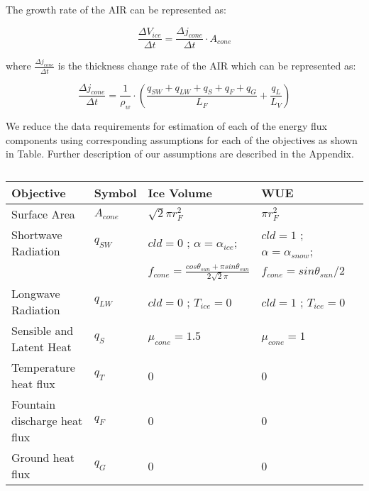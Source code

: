 \documentclass[tc, manuscript]{copernicus}
\begin{document}
The growth rate of the AIR can be represented as: 

\begin{equation}
  \frac{\Delta V_{ice}}{\Delta t}  =  \frac{\Delta j_{cone}}{ \Delta t} \cdot A_{cone}
	\label{eqn:freeze}
\end{equation}

where $\frac{\Delta j_{cone}}{\Delta t}$ is the thickness change rate of the AIR which can be represented as: 

\begin{equation}
  \frac{\Delta j_{cone}}{\Delta t}  = \frac{1}{\rho_w} \cdot (\frac{q_{SW} + q_{LW} + q_{S} + q_{F} + q_{G}}{L_F} + \frac{q_{L}}{L_V} )
	\label{eqn:freeze}
\end{equation}

We reduce the data requirements for estimation of each of the energy flux components using corresponding
assumptions for each of the objectives as shown in Table. Further description of our assumptions are described
in the Appendix. 

\begin{table}[]
\centering
\caption{}
\label{tab:my-table}
\begin{tabular}{@{}lllll@{}}
\toprule
\textbf{Objective} & \textbf{Symbol} & \textbf{Ice Volume} & \textbf{WUE} & \\ \midrule
\multicolumn{1}{|l}{Surface Area}        & $A_{cone}$ & $ \sqrt{2} \pi r_{F}^2$ & $\pi r_{F}^2$ & \multicolumn{1}{l|}{} \\ \midrule
\multicolumn{1}{|l}{Shortwave Radiation} & $q_{SW}$ & $cld = 0$ ; $\alpha=\alpha_{ice}$; & $cld = 1$ ;
$\alpha=\alpha_{snow}$; & \multicolumn{1}{l|}{} \\ 
\multicolumn{1}{|l}{ } &  & $f_{cone} = \frac{cos \theta_{sun} + \pi sin \theta_{sun}}{2\sqrt{2}\pi}$  & $f_{cone} = sin \theta_{sun} / 2$ & \multicolumn{1}{l|}{} \\ \midrule
\multicolumn{1}{|l}{Longwave Radiation}  & $q_{LW}$ & $cld = 0$ ; $T_{ice} = 0$ & $cld = 1$ ; $T_{ice} = 0$ & \multicolumn{1}{l|}{} \\ \midrule
\multicolumn{1}{|l}{Sensible and Latent Heat}       & $q_{S}$ &$\mu_{cone} = 1.5$  & $\mu_{cone} = 1$ & \multicolumn{1}{l|}{} \\ \midrule
\multicolumn{1}{|l}{Temperature heat flux} & $q_{T}$ & 0 & 0 & \multicolumn{1}{l|}{} \\ \midrule
\multicolumn{1}{|l}{Fountain discharge heat flux} & $q_{F}$ & 0 & 0 & \multicolumn{1}{l|}{} \\ \midrule
\multicolumn{1}{|l}{Ground heat flux}    & $q_{G}$ & 0 & 0 & \multicolumn{1}{l|}{} \\ \bottomrule
\end{tabular}
\end{table}
\end{document}
